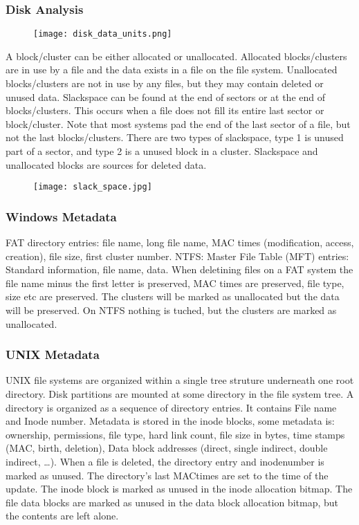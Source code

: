 \subsubsection{Disk Analysis}
\begin{figure}[h]
    \centering\texttt{[image: disk\_data\_units.png]}
\end{figure}
A block/cluster can be either allocated or unallocated. Allocated 
blocks/clusters are in use by a file and the data exists in a file on the file 
system. Unallocated blocks/clusters are not in use by any files, but they may 
contain deleted or unused data. Slackspace can be found at the end of sectors or
at the end of blocks/clusters. This occurs when a file does not fill its entire 
last sector or block/cluster. Note that most systems pad the end of the last 
sector of a file, but not the last blocks/clusters. There are two types of
slackspace, type 1 is unused part of a sector, and type 2 is a unused block
in a cluster. Slackspace and unallocated blocks are sources for deleted data.
\begin{figure}[h]
    \centering\texttt{[image: slack\_space.jpg]}
\end{figure}

\subsubsection{Windows Metadata}
FAT directory entries: file name, long file name, MAC times (modification, 
access, creation), file size, first cluster number. NTFS: Master File Table
(MFT) entries: Standard information, file name, data. When deletining files on a
FAT system the file name minus the first letter is preserved, MAC times are 
preserved, file type, size etc are preserved. The clusters will be marked as 
unallocated but the data will be preserved. On NTFS nothing is tuched, but the
clusters are marked as unallocated. 

\subsubsection{UNIX Metadata}
UNIX file systems are organized within a single tree struture underneath one 
root directory. Disk partitions are mounted at some directory in the file 
system tree. A directory is organized as a sequence of directory entries. It 
contains File name and Inode number. Metadata is stored in the inode blocks,
some metadata is: ownership, permissions, file type, hard link count, file size
in bytes, time stamps (MAC, birth, deletion), Data block addresses (direct, 
single indirect, double indirect, \ldots). When a file is deleted, the directory
entry and inodenumber is marked as unused. The directory’s last MACtimes are set
to the time of the update. The inode block is marked as unused in the inode 
allocation bitmap. The file data blocks are marked as unused in the data block 
allocation bitmap, but the contents are left alone.



